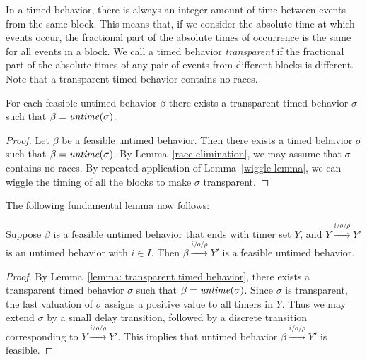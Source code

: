 
In a timed behavior, there is always an integer amount of time between events from the same block.
This means that, if we consider the absolute time at which events occur, the fractional part of the absolute times
of occurrence is the same for all events in a block.
We call a timed behavior \emph{transparent} if the fractional part of the absolute times of any pair of events from different blocks is different. Note that a transparent timed behavior contains no races.

\begin{lemma}
\label{lemma: transparent timed behavior}
For each feasible untimed behavior $\beta$ there exists
a transparent timed behavior $\sigma$ such that $\beta = \mathit{untime}(\sigma)$.
\end{lemma}
\iflong
\begin{proof}
Let $\beta$ be a feasible untimed behavior.
Then there exists a timed behavior $\sigma$ such that $\beta = \mathit{untime}(\sigma)$.
By Lemma~\ref{race elimination}, we may assume that $\sigma$ contains no races.
By repeated application of Lemma~\ref{wiggle lemma}, we can wiggle the timing of all the blocks to make $\sigma$ transparent.
\end{proof}
\fi

The following fundamental lemma now follows:

\begin{lemma}
\label{feasible plus input is feasible}
Suppose $\beta$ is a feasible untimed behavior that ends with timer set $Y$, and 
$Y \xrightarrow{i/o/\rho} Y'$ is an untimed behavior with $i \in I$.
Then $\beta \xrightarrow{i/o/\rho} Y'$ is a feasible untimed behavior.
\end{lemma}
\begin{proof}
By Lemma~\ref{lemma: transparent timed behavior}, there exists a transparent timed behavior
$\sigma$ such that $\beta = \mathit{untime}(\sigma)$. Since $\sigma$ is transparent, the last valuation of $\sigma$ assigns a positive value to
all timers in $Y$. Thus we may extend $\sigma$ by a small delay transition, followed by a discrete transition corresponding to
$Y \xrightarrow{i/o/\rho} Y'$. This implies that untimed behavior $\beta \xrightarrow{i/o/\rho} Y'$ is feasible.
\end{proof}

\iflong
